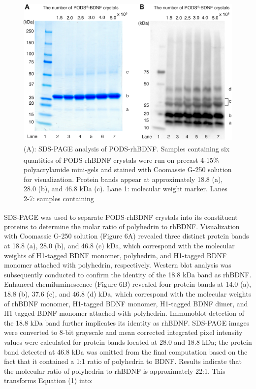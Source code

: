 \documentclass[review]{elsarticle}
\begin{document}
 \begin{figure}
 	\begin{center}
 		\includegraphics[width=13cm]{Fig_5.jpg}
 	\end{center}
 	\caption{(A): SDS-PAGE analysis of PODS\textsuperscript{\textregistered}-rhBDNF. Samples containing six quantities of PODS\textsuperscript{\textregistered}-rhBDNF crystals were run on precast 4-15\% polyacrylamide mini-gels and stained with Coomassie G-250 solution for visualization. Protein bands appear at approximately 18.8 (a), 28.0 (b), and 46.8 kDa (c). Lane 1: molecular weight marker. Lanes 2-7: samples containing   }
 \end{figure}
 
 
 SDS-PAGE was used to separate PODS\textsuperscript{\textregistered}-rhBDNF crystals into its constituent proteins to determine the molar ratio of polyhedrin to rhBDNF. Visualization with Coomassie G-250 solution (Figure 6A) revealed three distinct protein bands at 18.8 (a), 28.0 (b), and 46.8 (c) kDa, which correspond with the molecular weights of H1-tagged BDNF monomer, polyhedrin, and H1-tagged BDNF monomer attached with polyhedrin, respectively. Western blot analysis was subsequently conducted to confirm the identity of the 18.8 kDa band as rhBDNF. Enhanced chemiluminescence (Figure 6B) revealed four protein bands at 14.0 (a), 18.8 (b), 37.6 (c), and 46.8 (d) kDa, which correspond with the molecular weights of rhBDNF monomer, H1-tagged BDNF monomer, H1-tagged BDNF dimer, and H1-tagged BDNF monomer attached with polyhedrin. Immunoblot detection of the 18.8 kDa band further implicates its identity as rhBDNF. SDS-PAGE images were converted to 8-bit grayscale and mean corrected integrated pixel intensity values were calculated for protein bands located at 28.0 and 18.8 kDa; the protein band detected at 46.8 kDa was omitted from the final computation based on the fact that it contained a 1:1 ratio of polyhedrin to BDNF. Results indicate that the molecular ratio of polyhedrin to rhBDNF is approximately 22:1. This transforms Equation (1) into:
 
\end{document}
